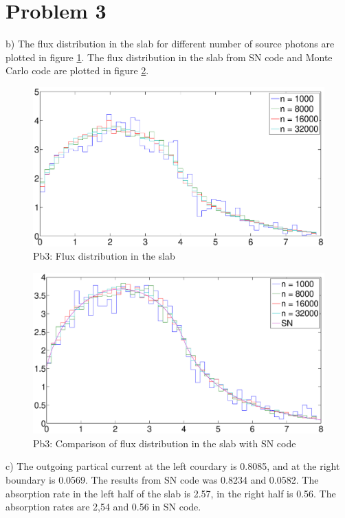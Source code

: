 \documentclass[paper=a4, fontsize=11pt]{article} %
\begin{document}
\clearpage

\section*{Problem 3}
b) 
The flux distribution in the slab for different number of source photons are plotted in figure \ref{flux_plot}. The flux distribution in the slab from SN code and Monte Carlo code are plotted in figure \ref{flux_plot_sn}.

\begin{figure}
    \includegraphics[width = \textwidth]{flux_plot.eps}
    \caption{Pb3: Flux distribution in the slab}
    \label{flux_plot}
\end{figure}

\begin{figure}
    \includegraphics[width = \textwidth]{flux_plot_sn.eps}
    \caption{Pb3: Comparison of flux distribution in the slab with SN code}
    \label{flux_plot_sn}
\end{figure}

c) The outgoing partical current at the left courdary is 0.8085, and at the right boundary is 0.0569. The results from SN code was 0.8234 and 0.0582. 
The absorption rate in the left half of the slab is 2.57, in the right half is 0.56. The absorption rates are 2,54 and 0.56 in SN code.
\end{document}
